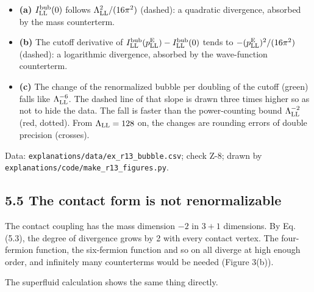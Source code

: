 \documentclass[
  10pt,
]{article}
\providecommand{\tightlist}{%
  \setlength{\itemsep}{0pt}\setlength{\parskip}{0pt}}
\begin{document}
\begin{itemize}
\tightlist
\item
  \textbf{(a)} \(I^{\rm bub}_{\rm LL}(0)\) follows
  \(\Lambda_{\rm LL}^2/(16\pi^2)\) (dashed): a quadratic divergence,
  absorbed by the mass counterterm.
\item
  \textbf{(b)} The cutoff derivative of
  \(I^{\rm bub}_{\rm LL}(p^{\rm E}_{\rm LL})-I^{\rm bub}_{\rm LL}(0)\)
  tends to \(-(p^{\rm E}_{\rm LL})^2/(16\pi^2)\) (dashed): a logarithmic
  divergence, absorbed by the wave-function counterterm.
\item
  \textbf{(c)} The change of the renormalized bubble per doubling of the
  cutoff (green) falls like \(\Lambda_{\rm LL}^{-6}\). The dashed line
  of that slope is drawn three times higher so as not to hide the data.
  The fall is faster than the power-counting bound
  \(\Lambda_{\rm LL}^{-2}\) (red, dotted). From \(\Lambda_{\rm LL}=128\)
  on, the changes are rounding errors of double precision (crosses).
\end{itemize}

Data: \texttt{explanations/data/ex\_r13\_bubble.csv}; check Z-8; drawn
by \texttt{explanations/code/make\_r13\_figures.py}.

\hypertarget{the-contact-form-is-not-renormalizable}{%
\subsection{5.5 The contact form is not
renormalizable}\label{the-contact-form-is-not-renormalizable}}

The contact coupling has the mass dimension \(-2\) in \(3+1\)
dimensions. By Eq. (5.3), the degree of divergence grows by 2 with every
contact vertex. The four-fermion function, the six-fermion function and
so on all diverge at high enough order, and infinitely many counterterms
would be needed (Figure 3(b)).

The superfluid calculation shows the same thing directly.
\end{document}
